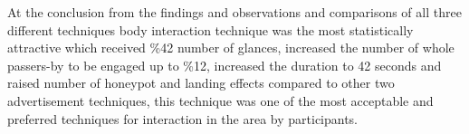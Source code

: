 At the conclusion from the findings and observations and comparisons of all three different techniques body interaction technique was the most statistically attractive which received \%42 number of glances, increased the number of whole passers-by to be engaged up to \%12, increased the duration to 42 seconds and raised number of honeypot and landing effects compared to other two advertisement techniques, this technique was one of the most acceptable and preferred techniques for interaction in the area by participants. 











































